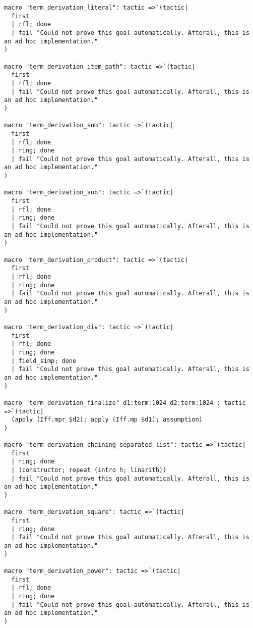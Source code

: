 \documentclass{article}
\begin{document}
\begin{tcolorbox}[colback=white!10, width=\linewidth]
\begin{lstlisting}[language=Lean4]
macro "term_derivation_literal": tactic =>`(tactic|
  first
  | rfl; done
  | fail "Could not prove this goal automatically. Afterall, this is an ad hoc implementation."
)

macro "term_derivation_item_path": tactic =>`(tactic|
  first
  | rfl; done
  | fail "Could not prove this goal automatically. Afterall, this is an ad hoc implementation."
)

macro "term_derivation_sum": tactic =>`(tactic|
  first
  | rfl; done
  | ring; done
  | fail "Could not prove this goal automatically. Afterall, this is an ad hoc implementation."
)

macro "term_derivation_sub": tactic =>`(tactic|
  first
  | rfl; done
  | ring; done
  | fail "Could not prove this goal automatically. Afterall, this is an ad hoc implementation."
)

macro "term_derivation_product": tactic =>`(tactic|
  first
  | rfl; done
  | ring; done
  | fail "Could not prove this goal automatically. Afterall, this is an ad hoc implementation."
)

macro "term_derivation_div": tactic =>`(tactic|
  first
  | rfl; done
  | ring; done
  | field_simp; done
  | fail "Could not prove this goal automatically. Afterall, this is an ad hoc implementation."
)

macro "term_derivation_finalize" d1:term:1024 d2:term:1024 : tactic =>`(tactic|
  (apply (Iff.mpr $d2); apply (Iff.mp $d1); assumption)
)

macro "term_derivation_chaining_separated_list": tactic =>`(tactic|
  first
  | ring; done
  | (constructor; repeat (intro h; linarith))
  | fail "Could not prove this goal automatically. Afterall, this is an ad hoc implementation."
)

macro "term_derivation_square": tactic =>`(tactic|
  first
  | ring; done
  | fail "Could not prove this goal automatically. Afterall, this is an ad hoc implementation."
)

macro "term_derivation_power": tactic =>`(tactic|
  first
  | rfl; done
  | ring; done
  | fail "Could not prove this goal automatically. Afterall, this is an ad hoc implementation."
)


\end{lstlisting}
\end{tcolorbox}
\end{document}
